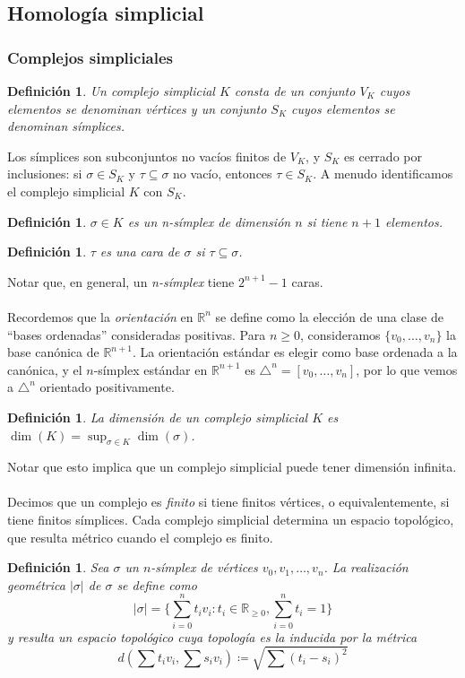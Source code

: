 \documentclass[12pt,a4paper]{article}
\newtheorem{definition}[theorem]{Definición}
\begin{document}
\subsection{Homología simplicial}
\subsubsection{Complejos simpliciales}
\begin{definition}
Un \textit{complejo simplicial} $K$ consta de un conjunto $V_K$ cuyos elementos se denominan \textit{vértices} y un conjunto $S_K$ cuyos elementos se denominan \textit{símplices}.
\end{definition}
Los símplices son subconjuntos no vacíos finitos de $V_K$, y $S_K$ es cerrado por inclusiones: si $\sigma \in S_K$ y $\tau \subseteq \sigma$ no vacío, entonces $\tau \in S_K$. A menudo identificamos el complejo simplicial $K$ con $S_K$.
\begin{definition}
    $\sigma \in K$ es un n-símplex de dimensión $n$ si tiene $n+1$ elementos.
\end{definition}
\begin{definition}
    $\tau$ es una cara de $\sigma$ si $\tau \subseteq \sigma$.
\end{definition}
Notar que, en general, un \textit{n-símplex} tiene $2^{n+1}-1$ caras.
\\
\\
Recordemos que la \textit{orientación} en $\mathbb{R}^n$ se define como la elección de una clase de ``bases ordenadas'' consideradas positivas. Para $n\geq 0$, consideramos $\{v_0, \ldots, v_n\}$ la base canónica de $\mathbb{R}^{n+1}$. La orientación estándar es elegir como base ordenada a la canónica, y el $n$-símplex estándar en $\mathbb{R}^{n+1}$ es $\triangle^n = [v_0, \ldots, v_n]$, por lo que vemos a $\triangle^n$ orientado positivamente.
\begin{definition}
    La dimensión de un complejo simplicial $K$ es $\dim(K) = \displaystyle{\sup_{\sigma \in K} \dim(\sigma)}$.
\end{definition}
Notar que esto implica que un complejo simplicial puede tener dimensión infinita.
\\
\\
Decimos que un complejo es \textit{finito} si tiene finitos vértices, o equivalentemente, si tiene finitos símplices. Cada complejo simplicial determina un espacio topológico, que resulta métrico cuando el complejo es finito.
\begin{definition}
Sea $\sigma$ un $n$-símplex de vértices $v_0,v_1,\ldots,v_n$. La realización geométrica $|\sigma|$ de $\sigma$ se define como
\[
|\sigma| = \{ \sum_{i=0}^n t_iv_i : t_i \in \mathbb{R}_{\geq 0}, \sum_{i=0}^n t_i = 1 \}
\]
y resulta un espacio topológico cuya topología es la inducida por la métrica
\[
d(\sum t_i v_i, \sum s_i v_i) \coloneqq \sqrt{\sum(t_i - s_i)^2}
\]
\end{definition}
\end{document}
